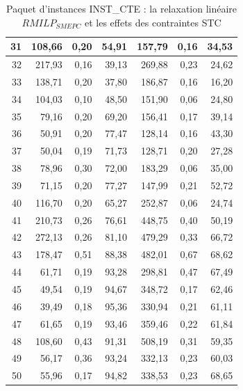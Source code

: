 {\begin{table}[H]
\begin{tabular}{|r|rrr|rrr|}
		31	&	108,66	&	0,20	&	54,91	&	157,79	&	0,16	&	34,53	\\ \hline
		32	&	217,93	&	0,16	&	39,13	&	269,88	&	0,23	&	24,62	\\ \hline
		33	&	138,71	&	0,20	&	37,80	&	186,87	&	0,16	&	16,20	\\ \hline
		34	&	104,03	&	0,10	&	48,50	&	151,90	&	0,06	&	24,80	\\ \hline
		35	&	79,16	&	0,20	&	69,20	&	156,41	&	0,17	&	39,14	\\ \hline
		36	&	50,91	&	0,20	&	77,47	&	128,14	&	0,16	&	43,30	\\ \hline
		37	&	50,04	&	0,19	&	71,73	&	128,71	&	0,20	&	27,28	\\ \hline
		38	&	78,96	&	0,30	&	72,00	&	183,29	&	0,06	&	35,00	\\ \hline
		39	&	71,15	&	0,20	&	77,27	&	147,99	&	0,21	&	52,72	\\ \hline
		40	&	116,70	&	0,20	&	65,27	&	252,87	&	0,06	&	24,74	\\ \hline
		41	&	210,73	&	0,26	&	76,61	&	448,75	&	0,40	&	50,19	\\ \hline
		42	&	272,13	&	0,26	&	81,10	&	479,29	&	0,33	&	66,72	\\ \hline
		43	&	178,47	&	0,51	&	88,38	&	482,01	&	0,67	&	68,62	\\ \hline
		44	&	61,71	&	0,19	&	93,28	&	298,81	&	0,47	&	67,49	\\ \hline
		45	&	49,54	&	0,19	&	94,67	&	348,72	&	0,17	&	62,46	\\ \hline
		46	&	39,49	&	0,18	&	95,36	&	330,94	&	0,21	&	61,11	\\ \hline
		47	&	61,65	&	0,19	&	93,46	&	359,46	&	0,22	&	61,84	\\ \hline
		48	&	108,60	&	0,43	&	91,31	&	508,19	&	0,31	&	59,35	\\ \hline
		49	&	56,17	&	0,36	&	93,24	&	332,13	&	0,23	&	60,03	\\ \hline
		50	&	55,96	&	0,17	&	94,82	&	338,53	&	0,23	&	68,65	\\ \hline
		
		
		\bottomrule
	\end{tabular}%
	\caption[Impact des contraintes STC sur les résultats de \textit{$RMILP_{SMEPC}$} sur INST\_CTE]{Paquet d'instances INST\_CTE : la relaxation linéaire \textit{$RMILP_{SMEPC}$} et les effets des contraintes STC}
	\label{tab:frac3}%
\end{table}%

}

